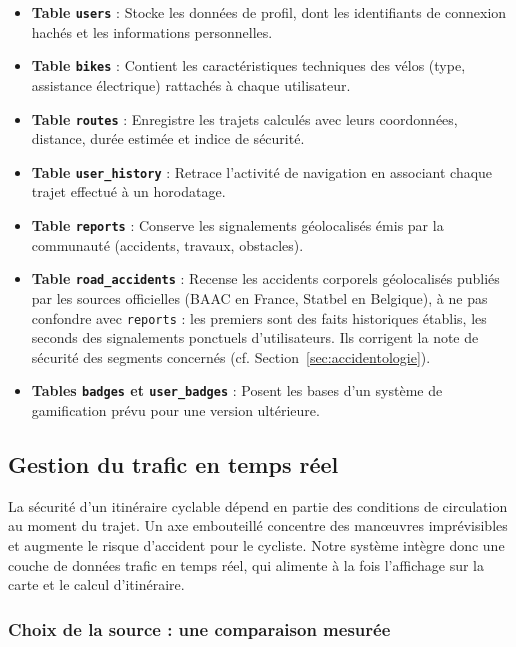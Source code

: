 \begin{itemize}
    \item \textbf{Table \texttt{users}} : Stocke les données de profil, dont les identifiants de connexion hachés et les informations personnelles.
    \item \textbf{Table \texttt{bikes}} : Contient les caractéristiques techniques des vélos (type, assistance électrique) rattachés à chaque utilisateur.
    \item \textbf{Table \texttt{routes}} : Enregistre les trajets calculés avec leurs coordonnées, distance, durée estimée et indice de sécurité.
    \item \textbf{Table \texttt{user\_history}} : Retrace l'activité de navigation en associant chaque trajet effectué à un horodatage.
    \item \textbf{Table \texttt{reports}} : Conserve les signalements géolocalisés émis par la communauté (accidents, travaux, obstacles).
    \item \textbf{Table \texttt{road\_accidents}} : Recense les accidents corporels géolocalisés publiés par les sources officielles (BAAC en France, Statbel en Belgique), à ne pas confondre avec \texttt{reports} : les premiers sont des faits historiques établis, les seconds des signalements ponctuels d'utilisateurs. Ils corrigent la note de sécurité des segments concernés (cf. Section~\ref{sec:accidentologie}).
    \item \textbf{Tables \texttt{badges} et \texttt{user\_badges}} : Posent les bases d'un système de gamification prévu pour une version ultérieure.
\end{itemize}

\subsection{Gestion du trafic en temps réel}

La sécurité d'un itinéraire cyclable dépend en partie des conditions de circulation au moment du trajet. Un axe embouteillé concentre des manœuvres imprévisibles et augmente le risque d'accident pour le cycliste. Notre système intègre donc une couche de données trafic en temps réel, qui alimente à la fois l'affichage sur la carte et le calcul d'itinéraire.

\subsubsection{Choix de la source : une comparaison mesurée}

